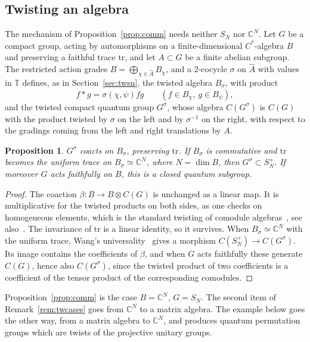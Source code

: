 \documentclass[11pt]{amsart}
\newtheorem{proposition}[theorem]{Proposition}
\theoremstyle{definition}
\theoremstyle{remark}
\theoremstyle{plain}
\numberwithin{equation}{section}
\numberwithin{table}{section}
\newcommand{\C}{\mathbb C}
\newcommand{\T}{\mathbb T}
\begin{document}
\subsection{Twisting an algebra}\label{sec:twalg}

The mechanism of Proposition~\ref{prop:comm} needs neither $S_N$ nor $\C^N$. Let $G$ be a compact group, acting by automorphisms on a finite-dimensional $C^*$-algebra $B$ and preserving a faithful trace $\mathrm{tr}$, and let $A\subset G$ be a finite abelian subgroup. The restricted action grades $B=\bigoplus_{\chi\in\widehat A}B_\chi$, and a $2$-cocycle $\sigma$ on $\widehat A$ with values in $\T$ defines, as in Section~\ref{sec:twsn}, the twisted algebra $B_\sigma$, with product
\[
f*g=\sigma(\chi,\psi)fg\qquad(f\in B_\chi,\ g\in B_\psi),
\]
and the twisted compact quantum group $G^\sigma$, whose algebra $C(G^\sigma)$ is $C(G)$ with the product twisted by $\sigma$ on the left and by $\sigma^{-1}$ on the right, with respect to the gradings coming from the left and right translations by $A$.

\begin{proposition}\label{prop:twalg}
$G^\sigma$ coacts on $B_\sigma$, preserving $\mathrm{tr}$. If $B_\sigma$ is commutative and $\mathrm{tr}$ becomes the uniform trace on $B_\sigma\simeq\C^N$, where $N=\dim B$, then $G^\sigma\subset S_N^+$. If moreover $G$ acts faithfully on $B$, this is a closed quantum subgroup.
\end{proposition}

\begin{proof}
The coaction $\beta:B\to B\otimes C(G)$ is unchanged as a linear map. It is multiplicative for the twisted products on both sides, as one checks on homogeneous elements, which is the standard twisting of comodule algebras~\cite{doi}, see also~\cite[Sec.~8]{bbn}. The invariance of $\mathrm{tr}$ is a linear identity, so it survives. When $B_\sigma\simeq\C^N$ with the uniform trace, Wang's universality~\cite{wa} gives a morphism $C(S_N^+)\to C(G^\sigma)$. Its image contains the coefficients of $\beta$, and when $G$ acts faithfully these generate $C(G)$, hence also $C(G^\sigma)$, since the twisted product of two coefficients is a coefficient of the tensor product of the corresponding comodules.
\end{proof}

Proposition~\ref{prop:comm} is the case $B=\C^N$, $G=S_N$. The second item of Remark~\ref{rem:twcases} goes from $\C^N$ to a matrix algebra. The example below goes the other way, from a matrix algebra to $\C^N$, and produces quantum permutation groups which are twists of the projective unitary groups.
\end{document}
